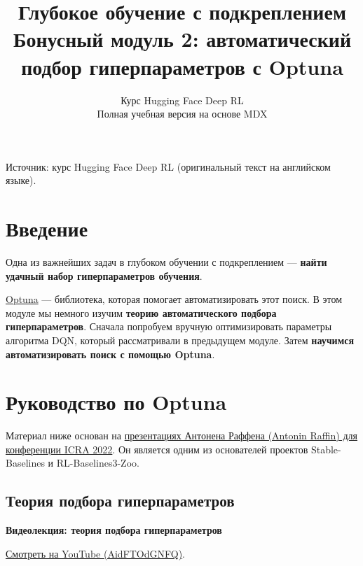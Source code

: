 \documentclass[11pt,a4paper]{article}
\title{\textbf{Глубокое обучение с подкреплением}\\[0.35em]\large Бонусный модуль 2: автоматический подбор гиперпараметров с Optuna}
\author{Курс Hugging Face Deep RL\\\small Полная учебная версия на основе MDX}
\date{}
\begin{document}
\selectfont
\maketitle
\vspace{-1em}
\begin{center}\small\color{secondary}Источник: курс Hugging Face Deep RL (оригинальный текст на английском языке).\end{center}
\vspace{-0.45em}
\begingroup\small\setlength{\parskip}{0pt}\tableofcontents\endgroup
\vspace{0.3em}

\section{Введение}\label{introduction}

Одна из важнейших задач в глубоком обучении с подкреплением --- \textbf{найти удачный набор гиперпараметров обучения}.


\href{https://optuna.org/}{Optuna} --- библиотека, которая помогает автоматизировать этот поиск. В этом модуле мы немного изучим \textbf{теорию автоматического подбора гиперпараметров}. Сначала попробуем вручную оптимизировать параметры алгоритма DQN, который рассматривали в предыдущем модуле. Затем \textbf{научимся автоматизировать поиск с помощью Optuna}.

\section{Руководство по Optuna}\label{optuna}

Материал ниже основан на \href{https://araffin.github.io/tools-for-robotic-rl-icra2022/}{презентациях Антонена Раффена (Antonin Raffin) для конференции ICRA 2022}. Он является одним из основателей проектов Stable-Baselines и RL-Baselines3-Zoo.

\subsection{Теория подбора гиперпараметров}

\begin{coursenote}
  \textbf{Видеолекция: теория подбора гиперпараметров}\par
  \href{https://www.youtube.com/watch?v=AidFTOdGNFQ}{Смотреть на YouTube (AidFTOdGNFQ)}.
\end{coursenote}
\end{document}
